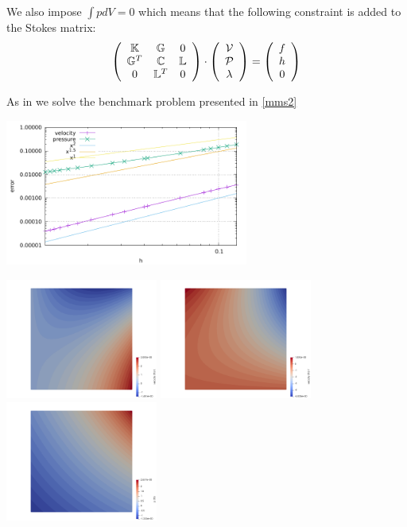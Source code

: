 We also impose $\int p dV=0$ which means that the following constraint is added 
to the Stokes matrix:
\[
\left(
\begin{array}{ccc}
{\mathbb{K}} & {\mathbb{G}} & 0\\ 
{\mathbb{G}}^T & {\mathbb{C}} & {\mathbb{L}} \\
0 & {\mathbb{L}}^T & 0 
\end{array}
\right)
\cdot
\left(
\begin{array}{c}
{\cal V} \\ {\cal P} \\ \lambda
\end{array}
\right)
=
\left(
\begin{array}{c}
 f \\ h \\ 0
\end{array}
\right)
\]

As in \cite{dobo04} we solve the benchmark problem presented in \ref{mms2}

\includegraphics[width=8cm]{python_codes/fieldstone_22/results/errors.pdf}

\includegraphics[width=5cm]{python_codes/fieldstone_22/results/uth}
\includegraphics[width=5cm]{python_codes/fieldstone_22/results/vth}
\includegraphics[width=5cm]{python_codes/fieldstone_22/results/pth}




